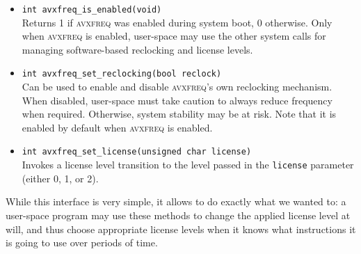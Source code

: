 \begin{itemize}
	\item \texttt{int avxfreq_is_enabled(void)} \\
		Returns 1 if \textsc{avxfreq} was enabled during system boot, 0 otherwise. Only when \textsc{avxfreq} is enabled, user-space may use the other system calls for managing software-based reclocking and license levels.
	\item \texttt{int avxfreq_set_reclocking(bool reclock)} \\
		Can be used to enable and disable \textsc{avxfreq}'s own reclocking mechanism. When disabled, user-space must take caution to always reduce frequency when required. Otherwise, system stability may be at risk. Note that it is enabled by default when \textsc{avxfreq} is enabled.
	\item \texttt{int avxfreq_set_license(unsigned char license)} \\
		Invokes a license level transition to the level passed in the \texttt{license} parameter (either 0, 1, or 2).
\end{itemize}

While this interface is very simple, it allows to do exactly what we wanted to: a user-space program may use these methods to change the applied license level at will, and thus choose appropriate license levels when it knows what instructions it is going to use over periods of time.